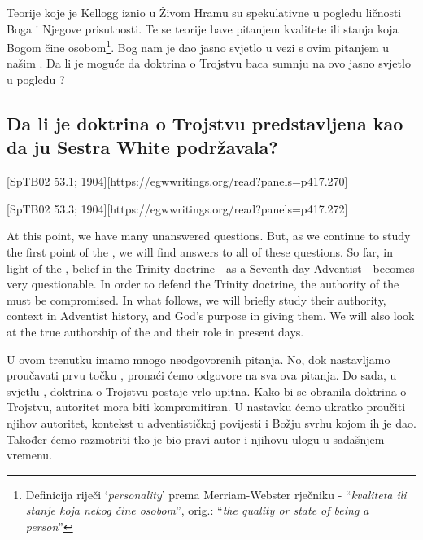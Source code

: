 Teorije koje je Kellogg iznio u Živom Hramu su spekulativne u pogledu ličnosti Boga i Njegove prisutnosti. Te se teorije bave pitanjem kvalitete ili stanja koja Bogom čine osobom\footnote{Definicija riječi ‘\textit{personality}’ prema Merriam-Webster rječniku - “\textit{kvaliteta ili stanje koja nekog čine osobom}”, orig.: “\textit{the quality or state of being a person}”}. Bog nam je dao jasno svjetlo u vezi s ovim pitanjem u našim . Da li je moguće da doktrina o Trojstvu baca sumnju na ovo jasno svjetlo u pogledu ?

\subsection*{Da li je doktrina o Trojstvu predstavljena kao da ju Sestra White podržavala?}

[SpTB02 53.1; 1904][https://egwwritings.org/read?panels=p417.270]

[SpTB02 53.3; 1904][https://egwwritings.org/read?panels=p417.272]


At this point, we have many unanswered questions. But, as we continue to study the first point of the , we will find answers to all of these questions. So far, in light of the , belief in the Trinity doctrine—as a Seventh-day Adventist—becomes very questionable. In order to defend the Trinity doctrine, the authority of the  must be compromised. In what follows, we will briefly study their authority, context in Adventist history, and God’s purpose in giving them. We will also look at the true authorship of the  and their role in present days.


U ovom trenutku imamo mnogo neodgovorenih pitanja. No, dok nastavljamo proučavati prvu točku , pronaći ćemo odgovore na sva ova pitanja. Do sada, u svjetlu , doktrina o Trojstvu postaje vrlo upitna. Kako bi se obranila doktrina o Trojstvu, autoritet  mora biti kompromitiran. U nastavku ćemo ukratko proučiti njihov autoritet, kontekst u adventističkoj povijesti i Božju svrhu kojom ih je dao. Također ćemo razmotriti tko je bio pravi autor  i njihovu ulogu u sadašnjem vremenu.

